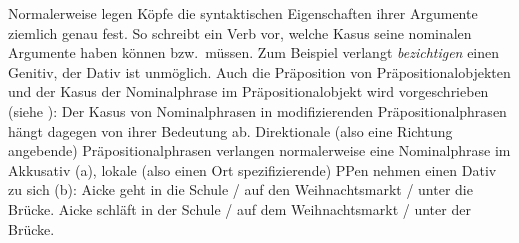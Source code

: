 \noindent
Normalerweise legen Köpfe die syntaktischen Eigenschaften ihrer Argumente
ziemlich genau fest. So schreibt ein Verb vor, welche Kasus seine nominalen
Argumente haben können bzw.\ müssen. Zum Beispiel verlangt \emph{bezichtigen} einen Genitiv, der
Dativ ist unmöglich.
\eal
{}
\zl
Auch die Präposition von Präpositionalobjekten und der Kasus der Nominalphrase
im Präpositionalobjekt wird vorgeschrieben (siehe \citealt[]{Eisenberg94a}):
\eal
{}
\zl
Der Kasus von Nominalphrasen in modifizierenden Präpositionalphrasen hängt dagegen
von ihrer Bedeutung ab. Direktionale (also eine Richtung angebende) Präpositionalphrasen 
verlangen normalerweise eine Nominalphrase im Akkusativ (a), lokale (also einen Ort spezifizierende)
PPen nehmen einen Dativ zu sich (b):
\eal
\ex Aicke geht in die Schule / auf den Weihnachtsmarkt / unter die Brücke.
\ex Aicke schläft in der Schule / auf dem Weihnachtsmarkt / unter der Brücke.
\zl


